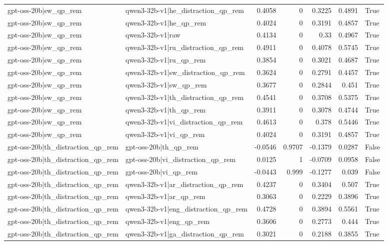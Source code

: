 \begin{table}
\begin{tabular}{l l r r r r l}
gpt-oss-20b|sw_qp_rem & qwen3-32b-v1|he_distraction_qp_rem & 0.4058 & 0 & 0.3225 & 0.4891 & True \\
gpt-oss-20b|sw_qp_rem & qwen3-32b-v1|he_qp_rem & 0.4024 & 0 & 0.3191 & 0.4857 & True \\
gpt-oss-20b|sw_qp_rem & qwen3-32b-v1|raw & 0.4134 & 0 & 0.33 & 0.4967 & True \\
gpt-oss-20b|sw_qp_rem & qwen3-32b-v1|ru_distraction_qp_rem & 0.4911 & 0 & 0.4078 & 0.5745 & True \\
gpt-oss-20b|sw_qp_rem & qwen3-32b-v1|ru_qp_rem & 0.3854 & 0 & 0.3021 & 0.4687 & True \\
gpt-oss-20b|sw_qp_rem & qwen3-32b-v1|sw_distraction_qp_rem & 0.3624 & 0 & 0.2791 & 0.4457 & True \\
gpt-oss-20b|sw_qp_rem & qwen3-32b-v1|sw_qp_rem & 0.3677 & 0 & 0.2844 & 0.451 & True \\
gpt-oss-20b|sw_qp_rem & qwen3-32b-v1|th_distraction_qp_rem & 0.4541 & 0 & 0.3708 & 0.5375 & True \\
gpt-oss-20b|sw_qp_rem & qwen3-32b-v1|th_qp_rem & 0.3911 & 0 & 0.3078 & 0.4744 & True \\
gpt-oss-20b|sw_qp_rem & qwen3-32b-v1|vi_distraction_qp_rem & 0.4613 & 0 & 0.378 & 0.5446 & True \\
gpt-oss-20b|sw_qp_rem & qwen3-32b-v1|vi_qp_rem & 0.4024 & 0 & 0.3191 & 0.4857 & True \\
gpt-oss-20b|th_distraction_qp_rem & gpt-oss-20b|th_qp_rem & -0.0546 & 0.9707 & -0.1379 & 0.0287 & False \\
gpt-oss-20b|th_distraction_qp_rem & gpt-oss-20b|vi_distraction_qp_rem & 0.0125 & 1 & -0.0709 & 0.0958 & False \\
gpt-oss-20b|th_distraction_qp_rem & gpt-oss-20b|vi_qp_rem & -0.0443 & 0.999 & -0.1277 & 0.039 & False \\
gpt-oss-20b|th_distraction_qp_rem & qwen3-32b-v1|ar_distraction_qp_rem & 0.4237 & 0 & 0.3404 & 0.507 & True \\
gpt-oss-20b|th_distraction_qp_rem & qwen3-32b-v1|ar_qp_rem & 0.3063 & 0 & 0.2229 & 0.3896 & True \\
gpt-oss-20b|th_distraction_qp_rem & qwen3-32b-v1|eng_distraction_qp_rem & 0.4728 & 0 & 0.3894 & 0.5561 & True \\
gpt-oss-20b|th_distraction_qp_rem & qwen3-32b-v1|eng_qp_rem & 0.3606 & 0 & 0.2773 & 0.444 & True \\
gpt-oss-20b|th_distraction_qp_rem & qwen3-32b-v1|ga_distraction_qp_rem & 0.3021 & 0 & 0.2188 & 0.3855 & True \\

\end{tabular}
\end{table}
